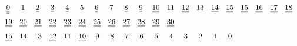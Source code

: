 \documentclass[UTF8,a4paper,zihao=-4]{article}
\renewcommand\underline{\bgroup\markoverwith
   {%
     \rule[-0.5ex]{2pt}{0.4pt}%
   }%
   \ULon}
\newcommand\doubleunderline{\bgroup\markoverwith
   {%
     \rule[-0.5ex]{2pt}{0.4pt}%
     \llap{{\rule[-0.8ex]{2pt}{0.4pt}}}%
   }%
   \ULon}
\newcommand\tripleunderline{\bgroup\markoverwith
   {%
     \rule[-0.5ex]{2pt}{0.4pt}%
     \llap{{\rule[-0.8ex]{2pt}{0.4pt}}}%
     \llap{{\rule[-1.1ex]{2pt}{0.4pt}}}%
   }%
   \ULon}
\begin{document}
\begin{align*}
    &\hspace{0.2em}\tripleunderline0\hspace{1.5em}1\hspace{1.5em}\underline2\hspace{1.5em}\underline3\hspace{1.5em}\underline4\hspace{1.5em}5\hspace{1.5em}\doubleunderline6\hspace{1.5em}7\hspace{1.5em}\underline8\hspace{1.5em}\underline9\hspace{1.3em}\doubleunderline{10}\hspace{1em}11\hspace{1em}\doubleunderline{12}\hspace{1em}13\hspace{1em}\underline{14}\hspace{1em}\doubleunderline{15}\hspace{1em}\doubleunderline{15}\hspace{1em}\doubleunderline{16}\hspace{1em}\doubleunderline{17}\hspace{1em}\doubleunderline{18}\hspace{1em}\\
    &\doubleunderline{19}\hspace{1em}\doubleunderline{20}\hspace{1em}\doubleunderline{21}\hspace{1em}\doubleunderline{22}\hspace{1em}\doubleunderline{23}\hspace{1em}\doubleunderline{24}\hspace{1em}\doubleunderline{25}\hspace{1em}\doubleunderline{26}\hspace{1em}\doubleunderline{27}\hspace{1em}\doubleunderline{28}\hspace{1em}\doubleunderline{29}\hspace{1em}\doubleunderline{30}\\
    &\doubleunderline{15}\quad\underline{14}\quad13\quad\doubleunderline{12}\quad11\quad\doubleunderline{10}\hspace{1.3em}\underline9\hspace{1.5em}\underline8\hspace{1.5em}\underline7\hspace{1.5em}\underline6\hspace{1.5em}\underline5\hspace{1.5em}\underline4\hspace{1.5em}\underline3\hspace{1.5em}\underline2\hspace{1.5em}\underline1\hspace{1.5em}\underline0
    \end{align*}
\end{document}
